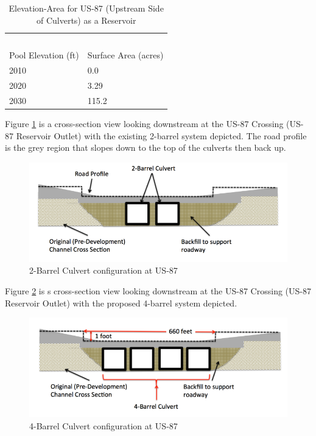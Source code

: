 \documentclass[12pt]{article}
\begin{document}
\begin{enumerate}
\begin{table}[h!]
\centering
\caption{Elevation-Area for US-87 (Upstream Side of Culverts) as a Reservoir}
\begin{tabular}{p{2.0in}p{2.0in}} %
~&~\\
Pool Elevation (ft) & Surface Area (acres) \\
\hline
\hline
2010 & 0.0\\
2020 & 3.29\\
2030 & 115.2\\
\hline
\end{tabular}
\label{tab:EA_87}
\end{table}

\clearpage

Figure \ref{fig:2barrel} is a cross-section view looking downstream at the US-87 Crossing (US-87
Reservoir Outlet) with the existing 2-barrel system depicted. The road profile is the grey
region that slopes down to the top of the culverts then back up.

\begin{figure}[h!] %
   \centering
   \includegraphics[width=6in]{2barrel.png} 
   \caption{2-Barrel Culvert configuration at US-87}
   \label{fig:2barrel}
\end{figure}

Figure \ref{fig:4barrel} is s cross-section view looking downstream at the US-87 Crossing (US-87
Reservoir Outlet) with the proposed 4-barrel system depicted.

\begin{figure}[h!] %
   \centering
   \includegraphics[width=6in]{4barrel.png} 
   \caption{4-Barrel Culvert configuration at US-87}
   \label{fig:4barrel}
\end{figure}


\end{enumerate}
\end{document}
